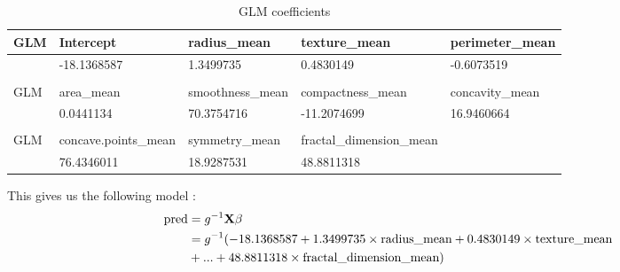 \begin{table}[H]
\centering
\begin{tabular}{lllll}
\hline
\multicolumn{1}{|l|}{GLM} & \multicolumn{1}{l|}{Intercept}            & \multicolumn{1}{l|}{radius\_mean}     & \multicolumn{1}{l|}{texture\_mean}     & \multicolumn{1}{l|}{perimeter\_mean} \\ \hline
\multicolumn{1}{|l|}{}    & \multicolumn{1}{l|}{-18.1368587}          & \multicolumn{1}{l|}{1.3499735}        & \multicolumn{1}{l|}{0.4830149}         & \multicolumn{1}{l|}{-0.6073519}      \\ \hline
                          &                                           &                                       &                                        &                                      \\ \hline
\multicolumn{1}{|l|}{GLM} & \multicolumn{1}{l|}{area\_mean}           & \multicolumn{1}{l|}{smoothness\_mean} & \multicolumn{1}{l|}{compactness\_mean} & \multicolumn{1}{l|}{concavity\_mean} \\ \hline
\multicolumn{1}{|l|}{}    & \multicolumn{1}{l|}{0.0441134}            & \multicolumn{1}{l|}{70.3754716}       & \multicolumn{1}{l|}{-11.2074699}       & \multicolumn{1}{l|}{16.9460664}      \\ \hline
                          &                                           &                                       &                                        &                                      \\ \hline
\multicolumn{1}{|l|}{GLM} & \multicolumn{1}{l|}{concave.points\_mean} & \multicolumn{1}{l|}{symmetry\_mean}   & fractal\_dimension\_mean               & \multicolumn{1}{l|}{}                \\ \hline
\multicolumn{1}{|l|}{}    & \multicolumn{1}{l|}{76.4346011}           & \multicolumn{1}{l|}{18.9287531}       & 48.8811318                             & \multicolumn{1}{l|}{}                \\ \hline
\end{tabular}
\caption{GLM coefficients}
\label{tab:coefs_glm}
\end{table}

This gives us the following model :
\begin{align*}
    \text{pred} &= g^{-1}\bold{X}\beta\\
    &=g^{-1}(-18.1368587 + 1.3499735 \times \text{radius\_mean} + 0.4830149 \times \text{texture\_mean}\\
    &+ ... + 48.8811318 \times \text{fractal\_dimension\_mean})
\end{align*}

